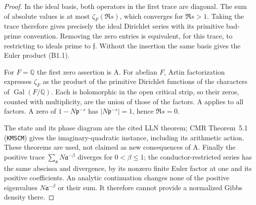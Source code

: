 \begin{proof}
In the ideal basis, both operators in the first trace are diagonal.
The sum of absolute values is at most $\zeta_F(\Re s)$, which
converges for $\Re s>1$. Taking the trace therefore gives precisely
the ideal Dirichlet series with its primitive bad-prime convention.
Removing the zero entries is equivalent, for this trace, to
restricting to ideals prime to $\mathfrak f$. Without the insertion
the same basis gives the Euler product (B1.1).

For $F=\mathbb Q$ the first zero assertion is A. For abelian $F$,
Artin factorization expresses $\zeta_F$ as the product of the
primitive Dirichlet functions of the characters of
$\operatorname{Gal}(F/\mathbb Q)$. Each is holomorphic in the open
critical strip, so their zeros, counted with multiplicity, are the
union of those of the factors. A applies to all factors. A zero
of $1-N\mathfrak p^{-s}$ has $|N\mathfrak p^{-s}|=1$, hence
$\Re s=0$.

The state and its phase diagram are the cited LLN theorem; CMR
Theorem~5.1 (\texttt{KMSCM}) gives the imaginary-quadratic instance,
including its arithmetic action. These theorems are used, not
claimed as new consequences of A. Finally the positive trace
$\sum_{\mathfrak a}N\mathfrak a^{-\beta}$ diverges for
$0<\beta\le1$; the conductor-restricted series has the same
abscissa and divergence, by its nonzero finite Euler factor at one
and its positive coefficients. An analytic continuation changes
none of the positive eigenvalues $N\mathfrak a^{-\beta}$ or their
sum. It therefore cannot provide a normalized Gibbs density there.
\end{proof}

